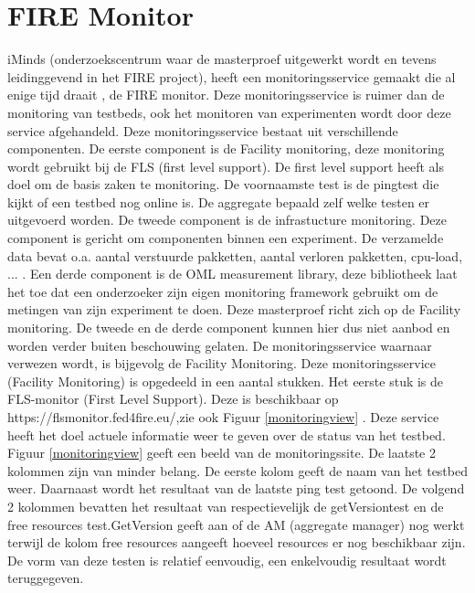 \section{FIRE Monitor}
\npar
iMinds (onderzoekscentrum waar de masterproef uitgewerkt wordt en tevens leidinggevend in het FIRE project), heeft een monitoringsservice gemaakt die al enige tijd draait \citep{fed4fire-second-fed-arch}, de FIRE monitor. Deze monitoringsservice is ruimer dan de monitoring van testbeds, ook het monitoren van experimenten wordt door deze service afgehandeld\citep{fed4fire-second-fed-arch}. 
\npar
Deze monitoringsservice bestaat uit verschillende componenten. De eerste component is de Facility monitoring, deze monitoring wordt gebruikt bij de FLS (first level support). De first level support heeft als doel om de basis zaken te monitoring. De voornaamste test is de pingtest die kijkt of een testbed nog online is. De aggregate bepaald zelf welke testen er uitgevoerd worden.
\clearpage
\npar
De tweede component is de infrastucture monitoring. Deze component is gericht om componenten binnen een experiment. De verzamelde data bevat o.a. aantal verstuurde pakketten, aantal verloren pakketten, cpu-load, ... .
\npar
Een derde component is de OML measurement library, deze bibliotheek laat het toe dat een onderzoeker zijn eigen monitoring framework gebruikt om de metingen van zijn experiment te doen.
\npar
Deze masterproef richt zich op de Facility monitoring. De tweede en de derde component kunnen hier dus niet aanbod en worden verder buiten beschouwing gelaten. De monitoringsservice waarnaar verwezen wordt, is bijgevolg de Facility Monitoring.
\npar
Deze monitoringsservice (Facility Monitoring) is opgedeeld in een aantal stukken. Het eerste stuk is de FLS-monitor (First Level Support). Deze is beschikbaar op https://flsmonitor.fed4fire.eu/,zie ook Figuur \ref{monitoringview} . Deze service heeft het doel actuele informatie weer te geven over de status van het testbed.
\npar
Figuur \ref{monitoringview} geeft een beeld van de monitoringssite. De laatste 2 kolommen zijn van minder belang. De eerste kolom geeft de naam van het testbed weer. Daarnaast wordt het resultaat van de laatste ping test getoond. De volgend 2 kolommen bevatten het resultaat van respectievelijk de getVersiontest en de free resources test.GetVersion geeft aan of de AM (aggregate manager) nog werkt terwijl de kolom free resources aangeeft hoeveel resources er nog beschikbaar zijn. De vorm van deze testen is relatief eenvoudig, een enkelvoudig resultaat wordt teruggegeven.

